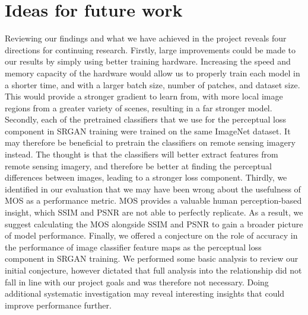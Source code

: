 \section{Ideas for future work}
Reviewing our findings and what we have achieved in the project reveals four directions for continuing research. Firstly, large improvements could be made to our results by simply using better training hardware. Increasing the speed and memory capacity of the hardware would allow us to properly train each model in a shorter time, and with a larger batch size, number of patches, and dataset size. This would provide a stronger gradient to learn from, with more local image regions from a greater variety of scenes, resulting in a far stronger model. Secondly, each of the pretrained classifiers that we use for the perceptual loss component in SRGAN training were trained on the same ImageNet dataset. It may therefore be beneficial to pretrain the classifiers on remote sensing imagery instead. The thought is that the classifiers will better extract features from remote sensing imagery, and therefore be better at finding the perceptual differences between images, leading to a stronger loss component. Thirdly, we identified in our evaluation that we may have been wrong about the usefulness of MOS as a performance metric. MOS provides a valuable human perception-based insight, which SSIM and PSNR are not able to perfectly replicate. As a result, we suggest calculating the MOS alongside SSIM and PSNR to gain a broader picture of model performance. Finally, we offered a conjecture on the role of accuracy in the performance of image classifier feature maps as the perceptual loss component in SRGAN training. We performed some basic analysis to review our initial conjecture, however dictated that full analysis into the relationship did not fall in line with our project goals and was therefore not necessary. Doing additional systematic investigation may reveal interesting insights that could improve performance further.